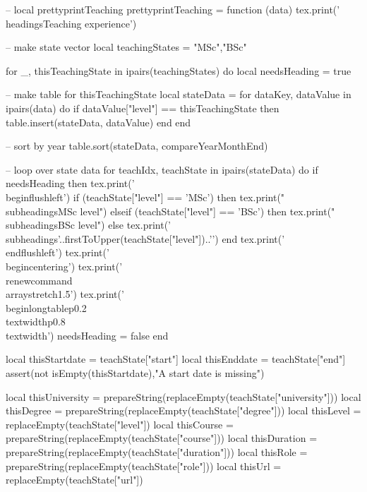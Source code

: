 \documentclass[letterpaper, 10pt]{article}
\newcommand{\headings}[1]{\section*{#1} \hrule \vspace{10pt}}
\newcommand{\subheadings}[1]{\textbf{#1} \vspace{5pt}}
\begin{document}
\begin{luacode}
	-- local prettyprintTeaching
	prettyprintTeaching = function (data)
		tex.print('\\headings{Teaching experience}')

		-- make state vector
		local teachingStates = {"MSc","BSc"}

		for _, thisTeachingState in ipairs(teachingStates) do
			local needsHeading = true

			-- make table for thisTeachingState
			local stateData = {}
			for dataKey, dataValue in ipairs(data) do
				if dataValue["level"] == thisTeachingState then
					table.insert(stateData, dataValue)
				end
			end

			-- sort by year
			table.sort(stateData, compareYearMonthEnd)

			-- loop over state data
			for teachIdx, teachState in ipairs(stateData) do
				if needsHeading then
					tex.print('\\begin{flushleft}')
					if (teachState["level"] == 'MSc') then
						tex.print("\\subheadings{MSc level}")
					elseif (teachState["level"] == 'BSc') then
						tex.print("\\subheadings{BSc level}")
					else
						tex.print('\\subheadings{'..firstToUpper(teachState["level"])..'}')
					end
					tex.print('\\end{flushleft}')
					tex.print('\\begin{centering}')
					tex.print('\\renewcommand{\\arraystretch}{1.5}')
					tex.print('\\begin{longtable}{p{0.2\\textwidth}p{0.8\\textwidth}}')
					needsHeading = false
				end

				local thisStartdate = teachState["start"]
				local thisEnddate   = teachState["end"]
				assert(not isEmpty(thisStartdate),"A start date is missing")

				local thisUniversity = prepareString(replaceEmpty(teachState["university"]))
				local thisDegree	 = prepareString(replaceEmpty(teachState["degree"]))
				local thisLevel 	= replaceEmpty(teachState["level"])
				local thisCourse 	= prepareString(replaceEmpty(teachState["course"]))
				local thisDuration 	= prepareString(replaceEmpty(teachState["duration"]))
				local thisRole 		= prepareString(replaceEmpty(teachState["role"]))
				local thisUrl 		= replaceEmpty(teachState["url"])


\end{luacode}
\end{document}
